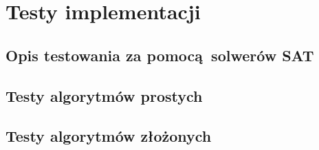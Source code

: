 \chapter{Testy implementacji}
\section{Opis testowania za pomocą solwerów SAT}
\section{Testy algorytmów prostych}
\section{Testy algorytmów złożonych}